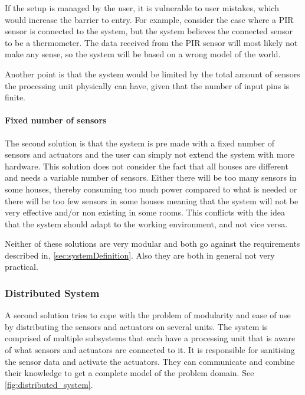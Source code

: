 If the setup is managed by the user, it is vulnerable to user mistakes, which would increase the barrier to entry. For example, consider the case where a PIR sensor is connected to the system, but the system believes the connected sensor to be a thermometer. The data received from the PIR sensor will most likely not make any sense, so the system will be based on a wrong model of the world.

Another point is that the system would be limited by the total amount of sensors the processing unit physically can have, given that the number of input pins is finite.

\paragraph{Fixed number of sensors}
The second solution is that the system is pre made with a fixed number of sensors and actuators and the user can simply not extend the system with more hardware. This solution does not consider the fact that all houses are different and needs a variable number of sensors. Either there will be too many sensors in some houses, thereby consuming too much power compared to what is needed or there will be too few sensors in some houses meaning that the system will not be very effective and/or non existing in some rooms. This conflicts with the idea that the system should adapt to the working environment, and not vice versa.

Neither of these solutions are very modular and both go against the requirements described in, \cref{sec:systemDefinition}. Also they are both in general not very practical.

\subsubsection{Distributed System}
A second solution tries to cope with the problem of modularity and ease of use by distributing the sensors and actuators on several units. The system is comprised of multiple subsystems that each have a processing unit that is aware of what sensors and actuators are connected to it. It is responsible for sanitising the sensor data and activate the actuators. They can communicate and combine their knowledge to get a complete model of the problem domain. See \cref{fig:distributed_system}.

